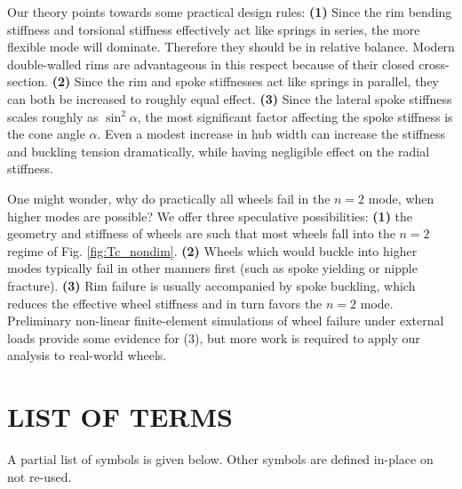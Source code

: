 \documentclass{bmd2016p}
\begin{document}
Our theory points towards some practical design rules: \textbf{(1)} Since the rim bending stiffness and torsional stiffness effectively act like springs in series, the more flexible mode will dominate. Therefore they should be in relative balance. Modern double-walled rims are advantageous in this respect because of their closed cross-section. \textbf{(2)} Since the rim and spoke stiffnesses act like springs in parallel, they can both be increased to roughly equal effect. \textbf{(3)} Since the lateral spoke stiffness scales roughly as $\sin^2{\alpha}$, the most significant factor affecting the spoke stiffness is the cone angle $\alpha$. Even a modest increase in hub width can increase the stiffness and buckling tension dramatically, while having negligible effect on the radial stiffness.

One might wonder, why do practically all wheels fail in the $n=2$ mode, when higher modes are possible? We offer three speculative possibilities: \textbf{(1)} the geometry and stiffness of wheels are such that most wheels fall into the $n=2$ regime of Fig. \ref{fig:Tc_nondim}. \textbf{(2)} Wheels which would buckle into higher modes typically fail in other manners first (such as spoke yielding or nipple fracture). \textbf{(3)} Rim failure is usually accompanied by spoke buckling, which reduces the effective wheel stiffness and in turn favors the $n=2$ mode. Preliminary non-linear finite-element simulations of wheel failure under external loads provide some evidence for (3), but more work is required to apply our analysis to real-world wheels.






\newpage
\section*{LIST OF TERMS}
A partial list of symbols is given below. Other symbols are defined in-place on not re-used.
\end{document}
